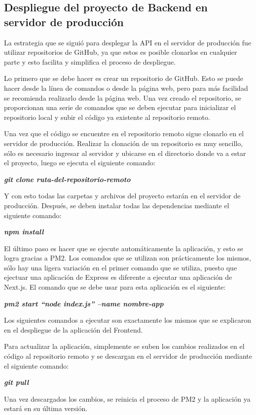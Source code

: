 \subsection{Despliegue del proyecto de Backend en servidor de producción}
La estrategia que se siguió para desplegar la API en el servidor de producción fue utilizar repositorios de GitHub, ya que estos es posible clonarlos en cualquier parte y esto facilita y simplifica el proceso de despliegue.

Lo primero que se debe hacer es crear un repositorio de GitHub. Esto se puede hacer desde la línea de comandos o desde la página web, pero para más facilidad se recomienda realizarlo desde la página web. Una vez creado el repositorio, se proporcionan una serie de comandos que se deben ejecutar para inicializar el repositorio local y subir el código ya existente al repositorio remoto.

Una vez que el código se encuentre en el repositorio remoto sigue clonarlo en el servidor de producción. Realizar la clonación de un repositorio es muy sencillo, sólo es necesario ingresar al servidor y ubicarse en el directorio donde va a estar el proyecto, luego se ejecuta el siguiente comando: 
    \begin{center}
        \textbf{
            \emph{
                git clone ruta-del-repositorio-remoto
                }
            }
    \end{center}
Y con esto todas las carpetas y archivos del proyecto estarán en el servidor de producción. Después, se deben instalar todas las dependencias mediante el siguiente comando:
    \begin{center}
        \textbf{
            \emph{
                npm install 
                }
            }
    \end{center}
El último paso es hacer que se ejecute automáticamente la aplicación, y esto se logra gracias a PM2. Los comandos que se utilizan son prácticamente los mismos, sólo hay una ligera variación en el primer comando que se utiliza, puesto que ejectuar una aplicación de Express es diferente a ejecutar una aplicación de Next.js. El comando que se debe usar para esta aplicación es el siguiente:
    \begin{center}
        \textbf{
            \emph{
                pm2 start ``node index.js'' --name nombre-app
                }
            }
    \end{center}
Los siguientes comandos a ejecutar son exactamente los mismos que se explicaron en el despliegue de la aplicación del Frontend.

Para actualizar la aplicación, simplemente se suben los cambios realizados en el código al repositorio remoto y se descargan en el servidor de producción mediante el siguiente comando:
    \begin{center}
        \textbf{
            \emph{
                git pull
                }
            }
    \end{center}
Una vez descargados los cambios, se reinicia el proceso de PM2 y la aplicación ya estará en su última versión.